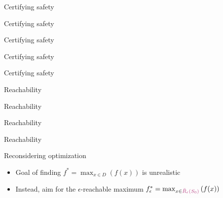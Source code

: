 \documentclass[xetex,10pt,mathserif]{beamer}
\newlength\figureheight
\newlength\figurewidth
\newcommand{\Rbeps}{\bar{R}_{\epsilon}}
\newcommand{\ccrbeps}{{\color{magenta!70!black}\Rbeps(S_0)}\xspace}
\begin{document}
\begin{frame}{Certifying safety}
\centering
\setlength\figurewidth{5in}
\setlength\figureheight{3.5in}

\end{frame}

\begin{frame}{Certifying safety}
\centering
\setlength\figurewidth{5in}
\setlength\figureheight{3.5in}

\end{frame}

\begin{frame}{Certifying safety}
\centering
\setlength\figurewidth{5in}
\setlength\figureheight{3.5in}

\end{frame}

\begin{frame}{Certifying safety}
\centering
\setlength\figurewidth{5in}
\setlength\figureheight{3.5in}

\end{frame}

\begin{frame}{Certifying safety}
\centering
\setlength\figurewidth{5in}
\setlength\figureheight{3.5in}

\end{frame}

\begin{frame}{Reachability}
\centering
\setlength\figurewidth{5in}
\setlength\figureheight{3.5in}

\end{frame}

\begin{frame}{Reachability}
\centering
\setlength\figurewidth{5in}
\setlength\figureheight{3.5in}

\end{frame}

\begin{frame}{Reachability}
\centering
\setlength\figurewidth{5in}
\setlength\figureheight{3.5in}

\end{frame}

\begin{frame}{Reachability}
\centering
\setlength\figurewidth{5in}
\setlength\figureheight{3.5in}

\end{frame}

\begin{frame}{Reconsidering optimization}
\begin{itemize}
\item<1-> Goal of finding $f^* = \max_{x \in D}\left(f(x)\right)$ is unrealistic
\vspace{2em}
\item<2-> Instead, aim for the $\epsilon$-reachable maximum $f_{\epsilon}^* = \max_{x \in \ccrbeps}\left(f(x)\right)$
\end{itemize}
\end{frame}
\end{document}

